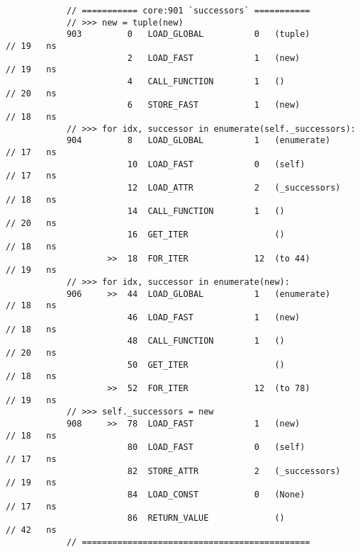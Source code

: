 \begin{code}
\begin{verbatim}
            // =========== core:901 `successors` ===========
            // >>> new = tuple(new)
            903         0   LOAD_GLOBAL          0   (tuple)                                        // 19   ns
                        2   LOAD_FAST            1   (new)                                          // 19   ns
                        4   CALL_FUNCTION        1   ()                                             // 20   ns
                        6   STORE_FAST           1   (new)                                          // 18   ns
            // >>> for idx, successor in enumerate(self._successors):
            904         8   LOAD_GLOBAL          1   (enumerate)                                    // 17   ns
                        10  LOAD_FAST            0   (self)                                         // 17   ns
                        12  LOAD_ATTR            2   (_successors)                                  // 18   ns
                        14  CALL_FUNCTION        1   ()                                             // 20   ns
                        16  GET_ITER                 ()                                             // 18   ns
                    >>  18  FOR_ITER             12  (to 44)                                        // 19   ns
            // >>> for idx, successor in enumerate(new):
            906     >>  44  LOAD_GLOBAL          1   (enumerate)                                    // 18   ns
                        46  LOAD_FAST            1   (new)                                          // 18   ns
                        48  CALL_FUNCTION        1   ()                                             // 20   ns
                        50  GET_ITER                 ()                                             // 18   ns
                    >>  52  FOR_ITER             12  (to 78)                                        // 19   ns
            // >>> self._successors = new
            908     >>  78  LOAD_FAST            1   (new)                                          // 18   ns
                        80  LOAD_FAST            0   (self)                                         // 17   ns
                        82  STORE_ATTR           2   (_successors)                                  // 19   ns
                        84  LOAD_CONST           0   (None)                                         // 17   ns
                        86  RETURN_VALUE             ()                                             // 42   ns
            // =============================================


\end{verbatim}
\end{code}
